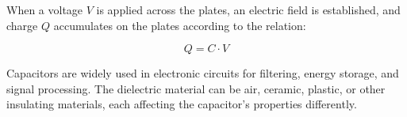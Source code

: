 When a voltage \( V \) is applied across the plates, an electric field is established, and charge \( Q \) accumulates on the plates according to the relation:

\[
Q = C \cdot V
\]

Capacitors are widely used in electronic circuits for filtering, energy storage, and signal processing. The dielectric material can be air, ceramic, plastic, or other insulating materials, each affecting the capacitor's properties differently.

